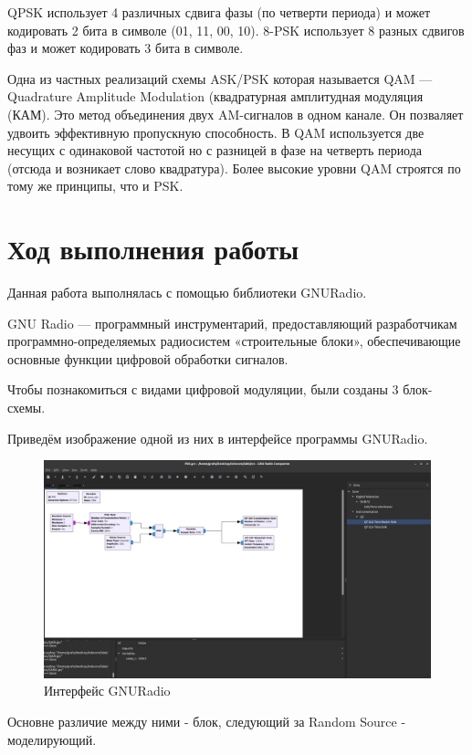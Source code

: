 QPSK использует 4 различных сдвига фазы (по четверти периода) и может кодировать 2 бита в символе (01, 11, 00, 10). 8-PSK использует 8 разных сдвигов фаз и может кодировать 3 бита в символе. 

Одна из частных реализаций схемы ASK/PSK которая называется QAM — Quadrature Amplitude Modulation (квадратурная амплитудная модуляция (КАМ). Это метод объединения двух AM-сигналов в одном канале. Он позваляет удвоить эффективную пропускную способность. В QAM используется две несущих с одинаковой частотой но с разницей в фазе на четверть периода (отсюда и возникает слово квадратура). Более высокие уровни QAM строятся по тому же принципы, что и PSK.

\newpage
\section{Ход выполнения работы}
Данная работа выполнялась с помощью библиотеки GNURadio.

GNU Radio — программный инструментарий, предоставляющий разработчикам программно-определяемых радиосистем «строительные блоки», обеспечивающие основные функции цифровой обработки сигналов.

Чтобы познакомиться с видами цифровой модуляции, были созданы 3 блок-схемы.

Приведём изображение одной из них в интерфейсе программы GNURadio.

\begin{figure}[H]
	\begin{center}
		\includegraphics[width=\linewidth]{pics/GNURadio}
		\caption{Интерфейс GNURadio}
		\label{fig:GNURadio}
	\end{center}
\end{figure}

Основне различие между ними - блок, следующий за Random Source - моделирующий.

